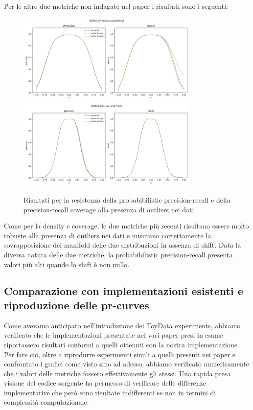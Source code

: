 Per le altre due metriche non indagate nel paper i risultati sono i seguenti:

\begin{figure}[!ht]
    \centering
    \includegraphics[width=0.8\textwidth]{../images/toyexperiments/outliers/shift_pPrecision_pRecall.png} 
    \includegraphics[width=0.8\textwidth]{../images/toyexperiments/outliers/shift_precision_recall.png} 
    \caption{Risultati per la resistenza della probabibilistic precision-recall e della precision-recall coverage alla presenza di outliers nei dati}
\end{figure}

Come per la density e coverage, le due metriche più recenti risultano essere molto robuste alla presenza di outliers nei dati e misurano correttamente la sovrapposizione dei manifold delle due distribuzioni in assenza di shift.
Data la diversa natura delle due metriche, la probabibilistic precision-recall presenta valori più alti quando lo shift è non nullo.

\subsection{Comparazione con implementazioni esistenti e riproduzione delle pr-curves}

Come avevamo anticipato nell'introduzione dei ToyData experiments, abbiamo verificato che le implementazioni presentate nei vari paper presi in esame riportassero risultati conformi a quelli ottenuti con la nostra implementazione.
Per fare ciò, oltre a riprodurre esperimenti simili a quelli presenti nei paper e confrontato i grafici come visto sino ad adesso, abbiamo verificato numericamente che i valori delle metriche fossero effettivamente gli stessi.
Una rapida presa visione del codice sorgente ha permesso di verificare delle differenze implementative che però sono risultate indifferenti se non in termini di complessità computazionale.

